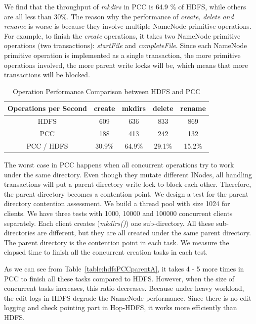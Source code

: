 \documentclass[runningheads,a4paper]{llncs}
\begin{document}
We find that the throughput of \textit{mkdirs} in PCC is 64.9 \% of HDFS, while others are all less than 30\%. The reason why the performance of \textit{create, delete and rename} is worse is because they involve multiple NameNode primitive operations. For example, to finish the \textit{create} operations, it takes two NameNode primitive operations (two transactions): \textit{startFile} and \textit{completeFile}. Since each NameNode primitive operation is implemented as a single transaction, the more primitive operations involved, the more parent write locks will be, which means that more transactions will be blocked.

\begin{table}[h]
	\centering
	\begin{tabular}{|c|c|c|c|c|}
		\hline
		\textbf{Operations per Second} & \textbf{create} & \textbf{mkdirs} & \textbf{delete} & \textbf{rename} \\ \hline
		HDFS                           & 609             & 636             & 833             & 869             \\ \hline
		PCC                 & 188             & 413             & 242             & 132             \\ \hline
		PCC / HDFS              & 30.9\%          & 64.9\%          & 29.1\%          & 15.2\%          \\ \hline
	\end{tabular}
	\caption{Operation Performance Comparison between HDFS and PCC}
	\label{table:nntpbb}
\end{table}

The worst case in PCC happens when all concurrent operations try to work under the same directory. Even though they mutate different INodes, all handling transactions will put a parent directory write lock to block each other. Therefore, the parent directory becomes a contention point. We design a test for the parent directory contention assessment. We build a thread pool with size 1024 for clients. We have three tests with 1000, 10000 and 100000 concurrent clients separately. Each client creates (\textit{mkdirs()}) one sub-directory. All these sub-directories are different, but they are all created under the same parent directory. The parent directory is the contention point in each task. We measure the elapsed time to finish all the concurrent creation tasks in each test.

As we can see from Table~\ref{table:hdfsPCCparentA}, it takes 4 - 5 more times in PCC to finish all these tasks compared to HDFS. However, when the size of concurrent tasks increases, this ratio decreases. Because under heavy workload, the edit logs in HDFS degrade the NameNode performance. Since there is no edit logging and check pointing part in Hop-HDFS, it works more efficiently than HDFS.
\end{document}
